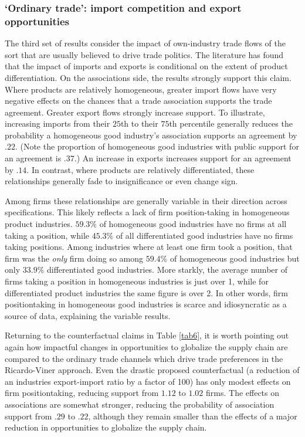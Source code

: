 \documentclass[hidelinks,12pt,letter]{article}
\begin{document}
\subsubsection*{`Ordinary trade': import competition and export opportunities}
The third set of results consider the impact of own-industry trade flows of the sort that are usually believed to drive trade politics. The literature has found that the impact of imports and exports is conditional on the extent of product differentiation. On the associations side, the results strongly support this claim. Where products are relatively homogeneous, greater import flows have very negative effects on the chances that a trade association supports the trade agreement. Greater export flows strongly increase support. To illustrate, increasing imports from their $25$th to their $75$th percentile generally reduces the probability a homogeneous good industry's association supports an agreement by $.22$. (Note the proportion of homogeneous good industries with public support for an agreement is $.37$.) An increase in exports increases support for an agreement by $.14$. In contrast, where products are relatively differentiated, these relationships generally fade to insignificance or even change sign. 

Among firms these relationships are generally variable in their direction across specifications. This likely reflects a lack of firm position-taking in homogeneous product industries. $59.3\%$ of homogeneous good industries have no firms at all taking a position, while $45.3\%$ of all differentiated good industries have no firms taking positions. Among industries where at least one firm took a position, that firm was the \textit{only} firm doing so among $59.4\%$ of homogeneous good industries but only $33.9\%$ differentiated good industries. More starkly, the average number of firms taking a position in homogeneous industries is just over 1, while for differentiated product industries the same figure is over 2. In other words, firm positiontaking in homogeneous good industries is scarce and idiosyncratic as a source of data, explaining the variable results.

Returning to the counterfactual claims in Table \ref{tab6}, it is worth pointing out again how impactful changes in opportunities to globalize the supply chain are compared to the ordinary trade channels which drive trade preferences in the Ricardo-Viner approach. Even the drastic proposed counterfactual (a reduction of an industries export-import ratio by a factor of 100) has only modest effects on firm positiontaking, reducing support from $1.12$ to $1.02$ firms. The effects on associations are somewhat stronger, reducing the probability of association support from $.29$ to $.22$, although they remain smaller than the effects of a major reduction in opportunities to globalize the supply chain.
\end{document}
